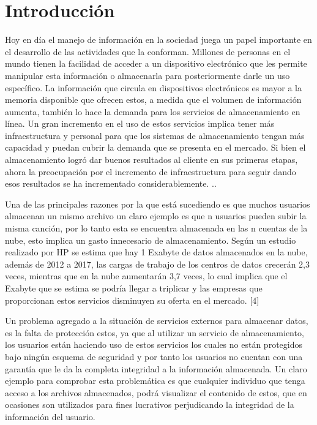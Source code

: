 \chapter{Introducci\'on}
\label{cha:introduccion}
Hoy en día el manejo de información en la sociedad juega un papel importante en el desarrollo de las actividades que la conforman. Millones de personas en el mundo tienen la facilidad de acceder a un dispositivo electrónico que les permite manipular esta información o almacenarla para posteriormente darle un uso específico. La información que circula en dispositivos electrónicos es mayor a la memoria disponible que ofrecen estos, a medida que el volumen de información aumenta, también lo hace la demanda para los servicios de almacenamiento en línea. Un gran incremento en el uso de estos servicios implica tener más infraestructura y personal para que los sistemas de almacenamiento tengan más capacidad y puedan cubrir la demanda que se presenta en el mercado. Si bien el almacenamiento logró dar buenos resultados al cliente en sus primeras etapas, ahora la preocupación por el incremento de infraestructura para seguir dando esos resultados se ha incrementado considerablemente. \cite{Bellare}.\cite{Keelveedhi}.

Una de las principales razones por la que está sucediendo es que muchos usuarios almacenan un mismo archivo un claro ejemplo es que n usuarios pueden subir la misma canción, por lo tanto esta se encuentra almacenada en las n cuentas de la nube, esto implica un gasto innecesario de almacenamiento. Según un estudio realizado por HP se estima que hay 1 Exabyte de datos almacenados en la nube, además de 2012 a 2017, las cargas de trabajo de los centros de datos crecerán 2,3 veces, mientras que en la nube aumentarán 3,7 veces, lo cual implica que el Exabyte que se estima se podría llegar a triplicar y las empresas que proporcionan estos servicios disminuyen su oferta en el mercado. [4]

Un problema agregado a la situación de servicios externos para almacenar datos, es la falta de protección estos, ya que al utilizar un servicio de almacenamiento, los usuarios están haciendo uso de estos servicios los cuales no están protegidos bajo ningún esquema de seguridad y por tanto los usuarios no cuentan con una garantía que le da la completa integridad a la información almacenada. Un claro ejemplo para comprobar esta problemática es que cualquier individuo que tenga acceso a los archivos almacenados, podrá visualizar el contenido de estos, que en ocasiones son utilizados para fines lucrativos perjudicando la integridad de la información del usuario.

